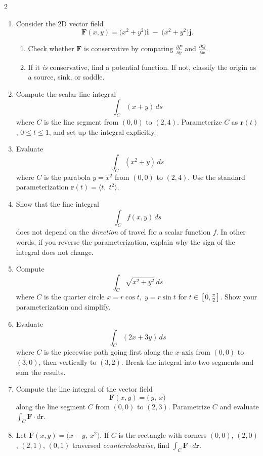\begin{multicols}{2}
\begin{enumerate}
\item \enspace
Consider the 2D vector field
\[
\mathbf{F}(x,y) = \bigl(x^2 + y^2\bigr)\mathbf{i}
\;-\;
\bigl(x^2 + y^2\bigr)\mathbf{j}.
\]
\begin{enumerate}
\item Check whether \(\mathbf{F}\) is conservative by comparing \(\tfrac{\partial P}{\partial y}\) and \(\tfrac{\partial Q}{\partial x}\).
\item If it \emph{is} conservative, find a potential function. If not, classify the origin as a source, sink, or saddle.
\end{enumerate}


\item 
Compute the scalar line integral
\[
\int_C (x + y)\,ds
\]
where \(C\) is the line segment from \((0,0)\) to \((2,4)\). Parameterize \(C\) as \(\mathbf{r}(t)\), \(0 \le t \le 1\), and set up the integral explicitly.

\item \enspace
Evaluate
\[
\int_C (x^2 + y)\,ds
\]
where \(C\) is the parabola \(y = x^2\) from \((0,0)\) to \((2,4)\). Use the standard parameterization \(\mathbf{r}(t) = \langle t,\;t^2\rangle\).

\item \enspace
Show that the line integral
\[
\int_C f(x,y)\,ds
\]
does not depend on the \emph{direction} of travel for a scalar function \(f\). In other words, if you reverse the parameterization, explain why the sign of the integral does not change.

\item 
Compute
\[
\int_C \sqrt{x^2 + y^2}\,ds
\]
where \(C\) is the quarter circle \(x=r\cos t,\;y=r\sin t\) for \(t \in [0,\tfrac{\pi}{2}]\). Show your parameterization and simplify.

\item \enspace
Evaluate
\[
\int_C (2x + 3y)\,ds
\]
where \(C\) is the piecewise path going first along the \(x\)-axis from \((0,0)\) to \((3,0)\), then vertically to \((3,2)\). Break the integral into two segments and sum the results.

\item 
Compute the line integral of the vector field
\[
\mathbf{F}(x,y) = \bigl(\,y,\ x\bigr)
\]
along the line segment \(C\) from \((0,0)\) to \((2,3)\). Parametrize \(C\) and evaluate
\(\displaystyle \int_C \mathbf{F}\cdot d\mathbf{r}\).

\item \enspace
Let \(\mathbf{F}(x,y) = \bigl(x-y,\ x^2\bigr)\). If \(C\) is the rectangle with corners \((0,0)\), \((2,0)\), \((2,1)\), \((0,1)\) traversed \emph{counterclockwise}, find
\(\displaystyle \int_C \mathbf{F}\cdot d\mathbf{r}\).


\end{enumerate}
\end{multicols}
